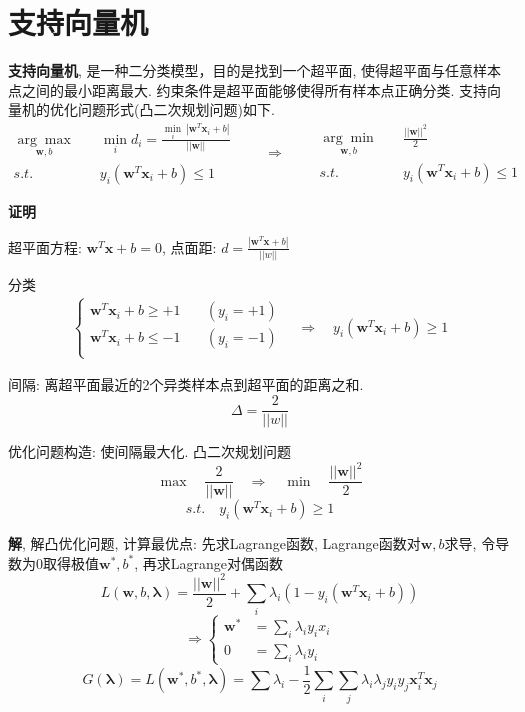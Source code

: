 \documentclass{article}
\newcommand{\defi}[2]{\textbf{#1}, #2}
\newcommand{\proof}[1]{\textbf{证明} #1}
\begin{document}
\section{支持向量机}
    \defi{支持向量机}{
        是一种二分类模型，目的是找到一个超平面, 使得超平面与任意样本点之间的最小距离最大. 约束条件是超平面能够使得所有样本点正确分类. 支持向量机的优化问题形式(凸二次规划问题)如下. 
        \[\begin{align*}
           \underset{\boldsymbol w, b}{\arg\max} &\quad \min\limits_i d_i = \frac{\min\limits_i\ |\boldsymbol w^T \boldsymbol x_i + b |}{||\boldsymbol w||}\\
           s.t. &\quad y_i (\boldsymbol w^T \boldsymbol x_i + b) \le 1
        \end{align*}
        \qquad \Rightarrow \qquad 
	    \begin{align*}
	        \underset{\boldsymbol w, b}{\arg\min}     &\quad	\frac{||\boldsymbol w||^2}{2}\\
			s.t.    &\quad	y_i (\boldsymbol w^T \boldsymbol x_i + b) \le 1
	    \end{align*}\]
    }
    
    \proof{	\par		
        超平面方程: $\boldsymbol w^T \boldsymbol x + b = 0$, \quad 点面距: $d = \frac{|\boldsymbol w^T \boldsymbol x + b|}{||w||}$
		
		分类
			\begin{align*}\left \{ \begin{array}{cc}
				\boldsymbol w^T \boldsymbol x_i + b \ge +1    &\quad (y_i = +1)\\
				\boldsymbol w^T \boldsymbol x_i + b \le -1	&\quad (y_i = -1)\\
			    \end{array} \right.
				\quad\Rightarrow\quad y_i (\boldsymbol w^T \boldsymbol x_i + b) \ge 1
			\end{align*}

		间隔: 离超平面最近的2个异类样本点到超平面的距离之和.
			\[\Delta = \frac{2}{||w||} \tag{间隔}\]
					
		优化问题构造: 使间隔最大化. 凸二次规划问题
		    \[\max\quad  \frac{2}{||\boldsymbol w||} \quad \Rightarrow \quad \min\quad  \frac{||\boldsymbol w||^2}{2}\]
			\[s.t.\quad	y_i (\boldsymbol w^T \boldsymbol x_i + b) \ge 1\]
	}
    
	\textbf{解}, 解凸优化问题, 计算最优点: 先求Lagrange函数, Lagrange函数对$\boldsymbol w, b$求导, 令导数为0取得极值$\boldsymbol w^*, b^*$, 再求Lagrange对偶函数
		\[L(\boldsymbol w, b,\boldsymbol \lambda) = \frac{||\boldsymbol w||^2}{2} + \sum_i \lambda_i (1 - y_i (\boldsymbol w^T \boldsymbol x_i + b)) \tag{Lagrange函数}\]
		\[\Rightarrow \left\{\begin{array}{rl} \boldsymbol w^* &= \sum\limits_i \lambda_i y_i x_i\\ 0 &= \sum\limits_i \lambda_i y_i \end{array}\right.\tag{$\boldsymbol w, b$极值}\]
		\[G(\boldsymbol \lambda) = L(\boldsymbol w^*, b^*, \boldsymbol \lambda) = \sum \lambda_i - \frac{1}{2} \sum_i \sum_j \lambda_i \lambda_j y_i y_j \boldsymbol x_i^T \boldsymbol x_j \tag{Lagrange对偶}\]
\end{document}
